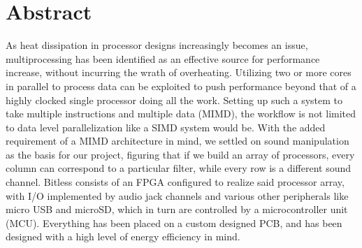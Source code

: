 
\section*{Abstract}
As heat dissipation in processor designs increasingly becomes an issue,
multiprocessing has been identified as an effective source for performance
increase, without incurring the wrath of overheating. Utilizing two or more
cores in parallel to process data can be exploited to push performance beyond
that of a highly clocked single processor doing all the work.
Setting up such
a system to take multiple instructions and multiple data (MIMD), the workflow
is not limited to data level parallelization like a SIMD system would be. With the added requirement of a MIMD architecture in mind, we settled on sound manipulation as the basis for our project,
figuring that if we build an array of processors, every column can correspond
to a particular filter, while every row is a different sound channel.\newline
{}
Bitless consists of an FPGA configured to realize said processor array, with
I/O implemented by audio jack channels and various other peripherals like micro
USB and microSD, which in turn are controlled by a microcontroller unit (MCU).
Everything has been placed on a custom designed PCB, and has been designed with
a high level of energy efficiency in mind.\newline
{}
